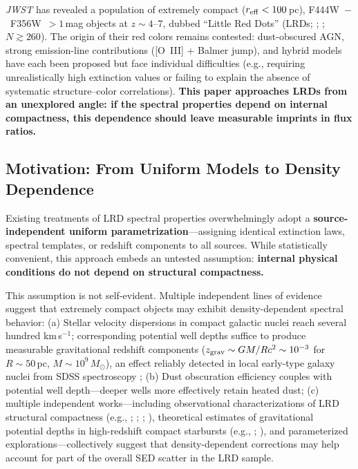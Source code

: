 \documentclass[apjl,twocolumn,longbibliography,linenumbers]{aastex701}
\begin{document}
\textit{JWST} has revealed a population of extremely compact
($r_{\rm eff} < 100$\,pc), F444W~$-$~F356W~$> 1$\,mag objects at
$z \sim 4$--$7$, dubbed ``Little Red Dots'' (LRDs;
\cite{Labbe2023}; \cite{Kokorev2024}; $N \gtrsim 260$).
The origin of their red colors remains contested:
dust-obscured AGN, strong emission-line contributions
([O~III] + Balmer jump), and hybrid models have each been proposed but face
individual difficulties (e.g., requiring unrealistically high extinction values
\cite{Calzetti2000,Gordon2003}
or failing to explain the absence of systematic structure--color correlations).
\textbf{This paper approaches LRDs from an unexplored angle:
if the spectral properties depend on internal compactness,
this dependence should leave measurable imprints in flux ratios.}

\subsection{Motivation: From Uniform Models to Density Dependence}

Existing treatments of LRD spectral properties overwhelmingly adopt a
\textbf{source-independent uniform parametrization}---assigning identical
extinction laws, spectral templates, or redshift components to all sources.
While statistically convenient, this approach embeds an untested assumption:
\textbf{internal physical conditions do not depend on structural compactness.}

This assumption is not self-evident.
Multiple independent lines of evidence suggest that extremely compact objects may
exhibit density-dependent spectral behavior:
(a) Stellar velocity dispersions in compact galactic nuclei reach several hundred
km\,s${}^{-1}$; corresponding potential well depths suffice to produce measurable
gravitational redshift components ($z_{\rm grav} \sim GM/Rc^2 \sim 10^{-3}$
for $R \sim 50$\,pc, $M \sim 10^{9}\,M_\odot$), an effect reliably detected in
local early-type galaxy nuclei from SDSS spectroscopy
\cite{Zahid2016,Zhu2018};
(b) Dust obscuration efficiency couples with potential well depth---deeper wells
more effectively retain heated dust;
(c) multiple independent works---including observational characterizations of
LRD structural compactness
(e.g., \cite{Labbe2023}; \cite{Kokorev2024};
\cite{Greene2024}; \cite{PGonzalez2025}),
theoretical estimates of gravitational potential depths in high-redshift
compact starbursts (e.g., \cite{Endsley2023}; \cite{Maiolino2024}),
and parameterized explorations---collectively suggest that
density-dependent corrections may help account for part of the overall SED
scatter in the LRD sample.
\end{document}
